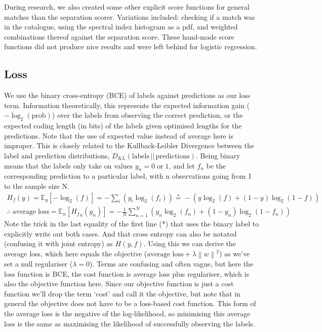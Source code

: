 \documentclass[12pt,a4paper]{article}
\newcommand{\norm}[1]{\left\lVert#1\right\rVert}
\begin{document}
During research, we also created some other explicit score functions for general matches than the separation scorer. Variations included: checking if a match was in the catalogue, using the spectral index histogram as a pdf, and weighted combinations thereof against the separation score. These hand-made score functions did not produce nice results and were left behind for logistic regression.

\newpage
\subsection{Loss}
\label{sec:loss}
We use the binary cross-entropy (BCE) of labels against predictions as our loss term. Information theoretically, this represents the expected information gain ($-\log_2{\mathrm{(prob)}}$) over the labels from observing the correct prediction, or the expected coding length (in bits) of the labels given optimised lengths for the predictions. Note that the use of expected value instead of average here is improper. This is closely related to the Kullback-Leibler Divergence between the label and prediction distributions, $D_{KL}(\mathrm{labels}\,\rvert\rvert\,\mathrm{predictions})$. Being binary means that the labels only take on values $y_n = 0 \mathrm{\;or\;} 1$, and let $f_n$ be the corresponding prediction to a particular label, with n observations going from 1 to the sample size N.
\begin{equation}
\begin{split}
    H_f(y) = \mathbb{E}_y [- \log_2(f)] = - \sum_{i} (y_i \log_2(f_i))
    \stackrel{*}{=} - (y \log_2(f) + (1-y) \log_2(1-f)) \\
    \therefore\; \mathrm{average\; loss} = \mathbb{E}_n [{H_f}_n(y_n)] = -\frac{1}{N} \sum_{n=1}^N (y_n \log_2(f_n) + (1-y_n) \log_2(1-f_n))    
\end{split}
\end{equation}
Note the trick in the last equality of the first line (*) that uses the binary label to explicitly write out both cases. And that cross entropy can also be notated (confusing it with joint entropy) as $H(y,f)$. Using this we can derive the average loss, which here equals the objective ($\mathrm{average\; loss} + \lambda \norm{w}^2$) as we've set a null regulariser ($\lambda=0$). Terms are confusing and often vague, but here the loss function is BCE, the cost function is average loss plus regulariser, which is also the objective function here. Since our objective function is just a cost function we'll drop the term `cost' and call it the objective, but note that in general the objective does not have to be a loss-based cost function. This form of the average loss is the negative of the log-likelihood, so minimising this average loss is the same as maximising the likelihood of successfully observing the labels.\\
\end{document}
